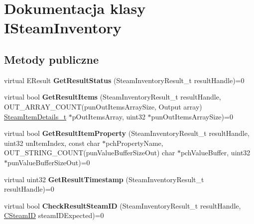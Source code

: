 \hypertarget{class_i_steam_inventory}{}\section{Dokumentacja klasy I\+Steam\+Inventory}
\label{class_i_steam_inventory}
\subsection*{Metody publiczne}
\begin{DoxyCompactItemize}
\item 
\mbox{\label{class_i_steam_inventory_a67b326d7d928ce691411dcc2f09d37ab}} 
virtual E\+Result {\bfseries Get\+Result\+Status} (Steam\+Inventory\+Result\+\_\+t result\+Handle)=0
\item 
\mbox{\label{class_i_steam_inventory_ac7b781c85de22e1bc790f36c99ecc231}} 
virtual bool {\bfseries Get\+Result\+Items} (Steam\+Inventory\+Result\+\_\+t result\+Handle, O\+U\+T\+\_\+\+A\+R\+R\+A\+Y\+\_\+\+C\+O\+U\+NT(pun\+Out\+Items\+Array\+Size, Output array) \hyperlink{struct_steam_item_details__t}{Steam\+Item\+Details\+\_\+t} $\ast$p\+Out\+Items\+Array, uint32 $\ast$pun\+Out\+Items\+Array\+Size)=0
\item 
\mbox{\label{class_i_steam_inventory_ac0149c1fc8b814d5d4d2019350efd01b}} 
virtual bool {\bfseries Get\+Result\+Item\+Property} (Steam\+Inventory\+Result\+\_\+t result\+Handle, uint32 un\+Item\+Index, const char $\ast$pch\+Property\+Name, O\+U\+T\+\_\+\+S\+T\+R\+I\+N\+G\+\_\+\+C\+O\+U\+NT(pun\+Value\+Buffer\+Size\+Out) char $\ast$pch\+Value\+Buffer, uint32 $\ast$pun\+Value\+Buffer\+Size\+Out)=0
\item 
\mbox{\label{class_i_steam_inventory_a62db5aaa59d5f3dc61b8bed315fcdf3a}} 
virtual uint32 {\bfseries Get\+Result\+Timestamp} (Steam\+Inventory\+Result\+\_\+t result\+Handle)=0
\item 
\mbox{\label{class_i_steam_inventory_a4a21657324ec103d90e5748e76192e3a}} 
virtual bool {\bfseries Check\+Result\+Steam\+ID} (Steam\+Inventory\+Result\+\_\+t result\+Handle, \hyperlink{class_c_steam_i_d}{C\+Steam\+ID} steam\+I\+D\+Expected)=0
\item 

\end{DoxyCompactItemize}
